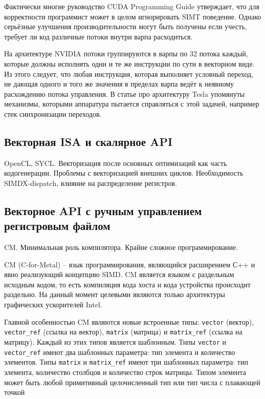 Фактически многие руководство CUDA Programming Guide \cite{guide2013cuda} утверждает, что для корректности программист может в целом игнорировать SIMT поведение. Однако серьёзные улучшения производительности могут быть получены если учесть, требует ли код различные потоки внутри варпа расходиться.

На архитектуре NVIDIA потоки группируются в варпы по 32 потока каждый, которые должны исполнять одни и те же инструкции по сути в векторном виде. Из этого следует, что любая инструкция, которая выполняет условный переход, не дающая одного и того же значения в пределах варпа ведёт к неявному расхождению потока управления. В статье про архитектуру Tesla \cite{lindholm2008nvidia} упомянуты механизмы, которыми аппаратура пытается справляться с этой задачей, например стек синхронизации переходов.

\subsection{Векторная ISA и скалярное API}\label{subsec:overview/vectorizing/sycl}

OpenCL, SYCL. Векторизация после основных оптимизаций как часть кодогенерации. Проблемы с векторизацией внешних циклов. Необходимость SIMDX-dispatch, влияние на распределение регистров.

\subsection{Векторное API с ручным управлением регистровым файлом}\label{subsec:overview/vectorizing/cm}

CM. Минимальная роль компилятора. Крайне сложное программирование.

CM (C-for-Metal) -- язык программирования, являющийся расширением С++ и явно реализующий концепцию SIMD. CM является языком с раздельным исходным кодом, то есть компиляция кода хоста и кода устройства происходит раздельно. На данный момент целевыми являются только архитектуры графических ускорителей Intel.

Главной особенностью CM являются новые встроенные типы: \texttt{vector} (вектор), \texttt{vector\_ref} (ссылка на вектор), \texttt{matrix} (матрица) и \texttt{matrix\_ref} (ссылка на матрицу). Каждый из этих типов является шаблонным. Типы \texttt{vector} и \texttt{vector\_ref} имеют два шаблонных параметра: тип элемента и количество элементов. Типы \texttt{matrix} и \texttt{matrix\_ref} имеют три шаблонных
параметра: тип элемента, количество столбцов и количество строк матрицы. Типом элемента может быть любой примитивный целочисленный тип или тип числа с плавающей точкой

